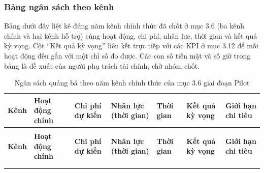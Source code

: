 \subsubsection{Bảng ngân sách theo kênh}

Bảng dưới đây liệt kê đúng năm kênh chính thức đã chốt ở mục 3.6 (ba kênh chính và hai kênh hỗ trợ) cùng hoạt động, chi phí, nhân lực, thời gian và kết quả kỳ vọng. Cột ``Kết quả kỳ vọng'' liên kết trực tiếp với các KPI ở mục 3.12 để mỗi hoạt động đều gắn với một chỉ số đo được. Các con số tiền mặt và số giờ trong bảng là đề xuất của người phụ trách tài chính, chờ nhóm chốt.

\begingroup
\scriptsize
\setlength{\tabcolsep}{2pt}
\renewcommand{\arraystretch}{1.3}
\begin{longtable}{@{}
    >{\raggedright\arraybackslash}p{2.2cm}
    >{\raggedright\arraybackslash}p{2.9cm}
    >{\raggedright\arraybackslash}p{2.6cm}
    >{\raggedright\arraybackslash}p{2.2cm}
    >{\raggedright\arraybackslash}p{1.5cm}
    >{\raggedright\arraybackslash}p{2.5cm}
    >{\raggedright\arraybackslash}p{1.4cm}@{}}
\caption{Ngân sách quảng bá theo năm kênh chính thức của mục 3.6 giai đoạn Pilot}
\label{tab:pa3-ns-kenh}\\
\toprule
\rowcolor{softBlue}
\textbf{Kênh} & \textbf{Hoạt động chính} & \textbf{Chi phí dự kiến} & \textbf{Nhân lực (thời gian)} & \textbf{Thời gian} & \textbf{Kết quả kỳ vọng} & \textbf{Giới hạn chi tiêu} \\
\midrule
\endfirsthead
\multicolumn{7}{@{}l}{\footnotesize\itshape (tiếp theo Bảng~\ref{tab:pa3-ns-kenh})}\\
\toprule
\rowcolor{softBlue}
\textbf{Kênh} & \textbf{Hoạt động chính} & \textbf{Chi phí dự kiến} & \textbf{Nhân lực (thời gian)} & \textbf{Thời gian} & \textbf{Kết quả kỳ vọng} & \textbf{Giới hạn chi tiêu} \\
\midrule
\endhead
\midrule
\multicolumn{7}{@{}r@{}}{\footnotesize\itshape Còn tiếp \dots}\\
\endfoot
\bottomrule
\endlastfoot


\end{longtable}
